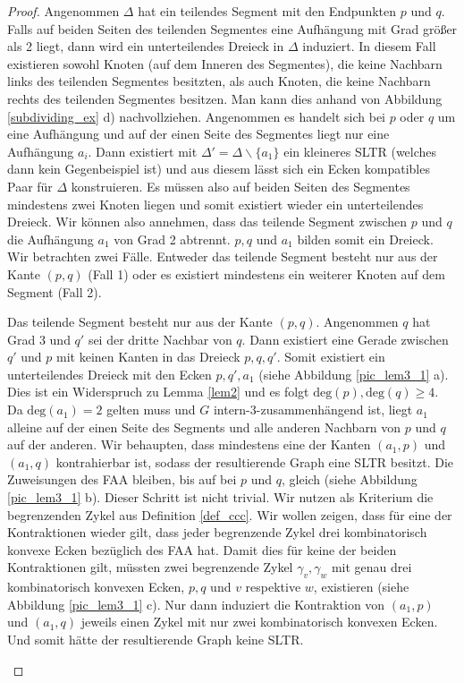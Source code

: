 \begin{proof}
Angenommen $\Delta$ hat ein teilendes Segment mit den Endpunkten $p$ und $q$. Falls auf beiden Seiten des teilenden Segmentes eine Aufhängung mit Grad größer als 2 liegt, dann wird ein unterteilendes Dreieck in $\Delta$ induziert. In diesem Fall existieren sowohl Knoten (auf dem Inneren des Segmentes), die keine Nachbarn links des teilenden Segmentes besitzten, als auch Knoten, die keine Nachbarn rechts des teilenden Segmentes besitzen. Man kann dies anhand von Abbildung \ref{subdividing_ex} d) nachvollziehen. Angenommen es handelt sich bei $p$ oder $q$ um eine Aufhängung und auf der einen Seite des Segmentes liegt nur eine Aufhängung $a_i$. Dann existiert mit $\Delta' = \Delta \backslash \{a_1\}$ ein kleineres SLTR (welches dann kein Gegenbeispiel ist) und aus diesem lässt sich ein Ecken kompatibles Paar für $\Delta$ konstruieren. Es müssen also auf beiden Seiten des Segmentes mindestens zwei Knoten liegen und somit existiert wieder ein unterteilendes Dreieck. Wir können also annehmen, dass das teilende Segment zwischen $p$ und $q$ die Aufhängung $a_1$ von Grad 2 abtrennt. $p,q$ und $a_1$ bilden somit ein Dreieck. Wir betrachten zwei Fälle. Entweder das teilende Segment besteht nur aus der Kante $(p,q)$ (Fall 1) oder es existiert mindestens ein weiterer Knoten auf dem Segment (Fall 2).

\begin{description}[leftmargin =0pt, font = \rmfamily ]
\item[Fall 1:] Das teilende Segment besteht nur aus der Kante $(p,q)$. Angenommen $q$ hat Grad 3 und $q'$ sei der dritte Nachbar von $q$. Dann existiert eine Gerade zwischen $q'$ und $p$ mit keinen Kanten in das Dreieck $p,q,q'$. Somit existiert ein unterteilendes Dreieck mit den Ecken $p,q',a_1$ (siehe Abbildung \ref{pic_lem3_1} a). Dies ist ein Widerspruch zu Lemma \ref{lem2} und es folgt $\text{deg}(p),\text{deg}(q) \geq 4$. Da $\text{deg}(a_1) = 2$ gelten muss und $G$ intern-3-zusammenhängend ist, liegt $a_1$ alleine auf der einen Seite des Segments und alle anderen Nachbarn von $p$ und $q$ auf der anderen. 
Wir behaupten, dass mindestens eine der Kanten $(a_1,p)$ und $(a_1,q)$ kontrahierbar ist, sodass der resultierende Graph eine SLTR besitzt. Die Zuweisungen des FAA bleiben, bis auf bei $p$ und $q$, gleich (siehe Abbildung \ref{pic_lem3_1} b). Dieser Schritt ist nicht trivial. Wir nutzen als Kriterium die begrenzenden Zykel aus Definition \ref{def_ccc}. Wir wollen zeigen, dass für eine der Kontraktionen wieder gilt, dass jeder begrenzende Zykel drei kombinatorisch konvexe Ecken bezüglich des FAA hat. Damit dies für keine der beiden Kontraktionen gilt, müssten zwei begrenzende Zykel $\gamma_v,\gamma_w$ mit genau drei kombinatorisch konvexen Ecken, $p,q$ und $v$ respektive $w$, existieren (siehe Abbildung \ref{pic_lem3_1} c). Nur dann induziert die Kontraktion von $(a_1,p)$ und $(a_1,q)$ jeweils einen Zykel mit nur zwei kombinatorisch konvexen Ecken. Und somit hätte der resultierende Graph keine SLTR.


\end{description}
\end{proof}
